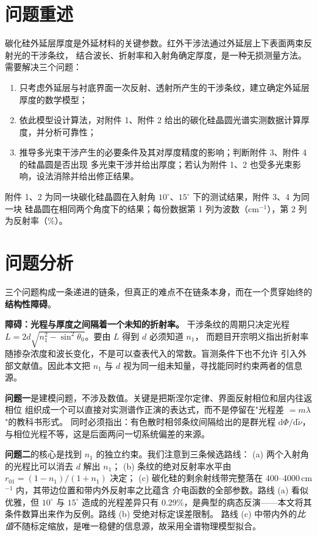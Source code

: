 \documentclass[12pt]{article}
\begin{document}
\section{问题重述}

碳化硅外延层厚度是外延材料的关键参数。红外干涉法通过外延层上下表面两束反射光的干涉条纹，
结合波长、折射率和入射角确定厚度，是一种无损测量方法。需要解决三个问题：

\begin{enumerate}[leftmargin=2em]
  \item 只考虑外延层与衬底界面一次反射、透射所产生的干涉条纹，建立确定外延层厚度的数学模型；
  \item 依此模型设计算法，对附件 1、附件 2 给出的碳化硅晶圆光谱实测数据计算厚度，并分析可靠性；
  \item 推导多光束干涉产生的必要条件及其对厚度精度的影响；判断附件 3、附件 4 的硅晶圆是否出现
        多光束干涉并给出厚度；若认为附件 1、2 也受多光束影响，设法消除并给出修正结果。
\end{enumerate}

附件 1、2 为同一块碳化硅晶圆在入射角 $10^\circ$、$15^\circ$ 下的测试结果，附件 3、4 为同一块
硅晶圆在相同两个角度下的结果；每份数据第 1 列为波数（cm$^{-1}$），第 2 列为反射率（\%）。

\section{问题分析}

三个问题构成一条递进的链条，但真正的难点不在链条本身，而在一个贯穿始终的\textbf{结构性障碍}。

\textbf{障碍：光程与厚度之间隔着一个未知的折射率。}\;
干涉条纹的周期只决定光程 $L=2d\sqrt{n_1^2-\sin^2\theta_0}$。要由 $L$ 得到 $d$ 必须知道 $n_1$，
而题目开宗明义指出折射率随掺杂浓度和波长变化，不是可以查表代入的常数。盲测条件下也不允许
引入外部文献值。因此本文把 $n_1$ 与 $d$ 视为同一组未知量，寻找能同时约束两者的信息源。

\textbf{问题一}是建模问题，不涉及数值。关键是把斯涅尔定律、界面反射相位和层内往返相位
组织成一个可以直接对实测谱作正演的表达式，而不是停留在"光程差 $=m\lambda$"的教科书形式。
同时必须指出：有色散时相邻条纹间隔给出的是群光程 $\mathrm{d}\Phi/\mathrm{d}\tilde\nu$，
与相位光程不等，这是后面两问一切系统偏差的来源。

\textbf{问题二}的核心是找到 $n_1$ 的独立约束。我们注意到三条候选路线：
(a) 两个入射角的光程比可以消去 $d$ 解出 $n_1$；
(b) 条纹的绝对反射率水平由 $r_{01}=(1-n_1)/(1+n_1)$ 决定；
(c) 碳化硅的剩余射线带完整落在 400--4000\,cm$^{-1}$ 内，其带边位置和带内外反射率之比蕴含
介电函数的全部参数。路线 (a) 看似优雅，但 $10^\circ$ 与 $15^\circ$ 造成的光程差异只有
0.29\%，是典型的病态反演——本文将其条件数算出来作为反例。路线 (b) 受绝对标定误差限制。
路线 (c) 中带内外的\emph{比值}不随标定缩放，是唯一稳健的信息源，故采用全谱物理模型拟合。
\end{document}
